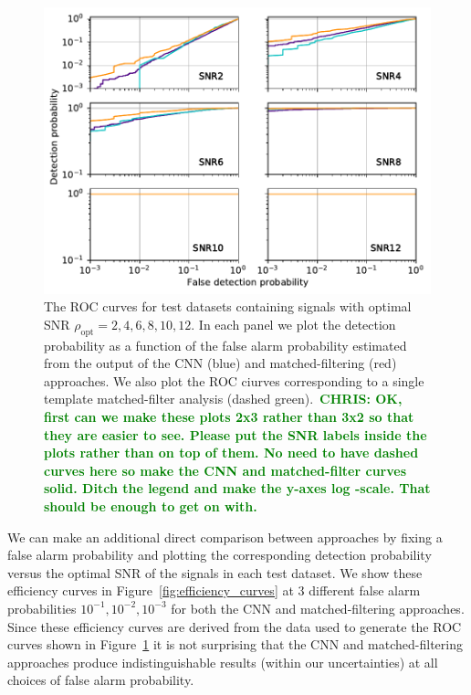 \documentclass[%
showpacs,
 amsmath,amssymb,
 aps,
 twocolumn,
 prl,
 reprint,
floatfix,
]{revtex4-1}
\newcommand{\chris}[1]{\textbf{\textcolor{green}{CHRIS: #1}}}
\begin{document}
%
%
\begin{figure}[]
\includegraphics[width=\columnwidth] {figures/ROC_curves.pdf}
\caption{The \ac{ROC} curves for test datasets containing signals with optimal
SNR $\rho_{\mathrm{opt}}=2,4,6,8,10,12$.  In each panel we plot the detection
probability as a function of the false alarm probability estimated from the
output of the \ac{CNN} (blue) and matched-filtering (red) approaches. We also
plot the \ac{ROC} ciurves corresponding to a single template matched-filter
analysis (dashed green).~\chris{OK, first can we make these plots 2x3 rather
than 3x2 so that they are easier to see. Please put the SNR labels inside the
plots rather than on top of them. No need to have dashed curves here so make
the CNN and matched-filter curves solid. Ditch the legend and make the y-axes
log -scale. That should be enough to get on with.\label{fig:ROC_curves}}}
\end{figure}

%
%
We can make an additional direct comparison between approaches by fixing a
false alarm probability and plotting the corresponding detection probability
versus the optimal SNR of the signals in each test dataset. We show these
efficiency curves in Figure~\ref{fig:efficiency_curves} at 3 different false alarm
probabilities $10^{-1},10^{-2},10^{-3}$ for both the \ac{CNN} and
matched-filtering approaches. Since these efficiency curves are derived from
the data used to generate the \ac{ROC} curves shown in
Figure~\ref{fig:ROC_curves} it is not surprising that the \ac{CNN} and
matched-filtering approaches produce indistinguishable results (within our
uncertainties) at all choices of false alarm probability.
\end{document}
